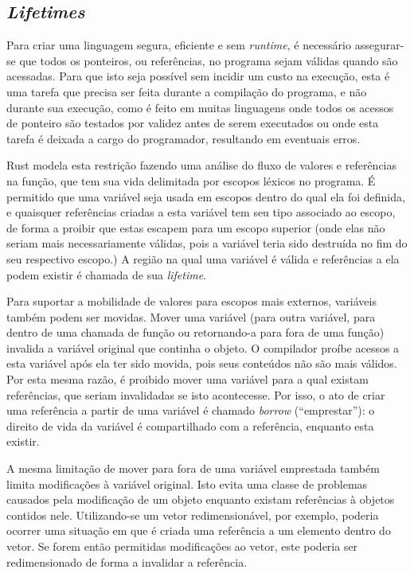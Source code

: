 \documentclass[tg]{mdtufsm}
\begin{document}
\subsection{\emph{Lifetimes}}

Para criar uma linguagem segura, eficiente e sem \emph{runtime}, é necessário assegurar-se que todos os ponteiros, ou referências, no programa sejam válidas quando são acessadas. Para que isto seja possível sem incidir um custo na execução, esta é uma tarefa que precisa ser feita durante a compilação do programa, e não durante sua execução, como é feito em muitas linguagens onde todos os acessos de ponteiro são testados por validez antes de serem executados ou onde esta tarefa é deixada a cargo do programador, resultando em eventuais erros.

Rust modela esta restrição fazendo uma análise do fluxo de valores e referências na função, que tem sua vida delimitada por escopos léxicos no programa. É permitido que uma variável seja usada em escopos dentro do qual ela foi definida, e quaisquer referências criadas a esta variável tem seu tipo associado ao escopo, de forma a proibir que estas escapem para um escopo superior (onde elas não seriam mais necessariamente válidas, pois a variável teria sido destruída no fim do seu respectivo escopo.) A região na qual uma variável é válida e referências a ela podem existir é chamada de sua \emph{lifetime}.

Para suportar a mobilidade de valores para escopos mais externos, variáveis também podem ser movidas. Mover uma variável (para outra variável, para dentro de uma chamada de função ou retornando-a para fora de uma função) invalida a variável original que continha o objeto. O compilador proíbe acessos a esta variável após ela ter sido movida, pois seus conteúdos não são mais válidos. Por esta mesma razão, é proibido mover uma variável para a qual existam referências, que seriam invalidadas se isto acontecesse. Por isso, o ato de criar uma referência a partir de uma variável é chamado \emph{borrow} (``emprestar''): o direito de vida da variável é compartilhado com a referência, enquanto esta existir.

A mesma limitação de mover para fora de uma variável emprestada também limita modificações à variável original. Isto evita uma classe de problemas causados pela modificação de um objeto enquanto existam referências à objetos contidos nele. Utilizando-se um vetor redimensionável, por exemplo, poderia ocorrer uma situação em que é criada uma referência a um elemento dentro do vetor. Se forem então permitidas modificações ao vetor, este poderia ser redimensionado de forma a invalidar a referência.
\end{document}
